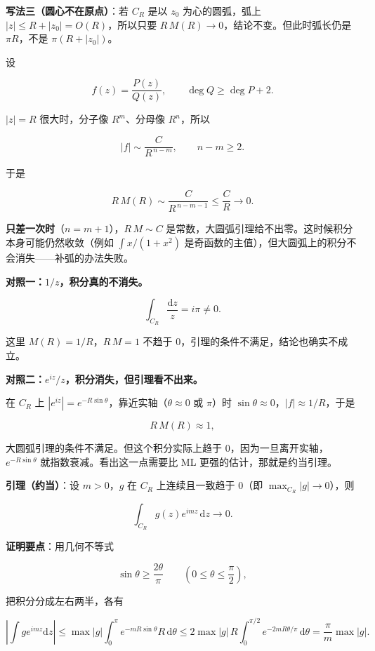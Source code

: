 \documentclass[11pt]{ctexart}
\let\origsubhdr\subhdr
\renewcommand{\subhdr}[1]{\par\needspace{4\baselineskip}\origsubhdr{#1}}
\begin{document}
\textbf{写法三（圆心不在原点）}：若 $C_R$ 是以 $z_0$ 为心的圆弧，弧上 $|z|\le R+|z_0|=O(R)$，所以只要 $R\,M(R)\to0$，结论不变。但此时弧长仍是 $\pi R$，不是 $\pi(R+|z_0|)$。


设

$$
f(z)=\frac{P(z)}{Q(z)},\qquad \deg Q\ge \deg P+2 .
$$

$|z|=R$ 很大时，分子像 $R^{m}$、分母像 $R^{n}$，所以

$$
|f|\sim \frac{C}{R^{\,n-m}},\qquad n-m\ge2 .
$$

于是

$$
R\,M(R)\sim \frac{C}{R^{\,n-m-1}}\le\frac{C}{R}\to0 .
$$

\textbf{只差一次时}（$n=m+1$），$R\,M\sim C$ 是常数，大圆弧引理给不出零。这时候积分本身可能仍然收敛（例如 $\int x/(1+x^2)$ 是奇函数的主值），但大圆弧上的积分不会消失——补弧的办法失败。


\textbf{对照一：$1/z$，积分真的不消失。}

$$
\int_{C_R}\frac{\mathrm{d}z}{z}=i\pi\ne0 .
$$

这里 $M(R)=1/R$，$R\,M=1$ 不趋于 0，引理的条件不满足，结论也确实不成立。

\textbf{对照二：$e^{iz}/z$，积分消失，但引理看不出来。}

在 $C_R$ 上 $|e^{iz}|=e^{-R\sin\theta}$，靠近实轴（$\theta\approx0$ 或 $\pi$）时 $\sin\theta\approx0$，$|f|\approx1/R$，于是

$$
R\,M(R)\approx 1,
$$

大圆弧引理的条件不满足。但这个积分实际上趋于 0，因为一旦离开实轴，$e^{-R\sin\theta}$ 就指数衰减。看出这一点需要比 ML 更强的估计，那就是约当引理。


\textbf{引理（约当）}：设 $m>0$，$g$ 在 $C_R$ 上连续且一致趋于 0（即 $\max_{C_R}|g|\to0$），则

$$
\int_{C_R}g(z)e^{imz}\,\mathrm{d}z\to0 .
$$

\textbf{证明要点}：用几何不等式

$$
\sin\theta\ge\frac{2\theta}{\pi}\qquad\left(0\le\theta\le\frac{\pi}{2}\right),
$$

把积分分成左右两半，各有

$$
\left|\int g e^{imz}\mathrm{d}z\right|
\le \max|g|\int_0^{\pi}e^{-mR\sin\theta}R\,\mathrm{d}\theta
\le 2\max|g|\,R\int_0^{\pi/2}e^{-2mR\theta/\pi}\,\mathrm{d}\theta
=\frac{\pi}{m}\max|g| .
$$
\end{document}
